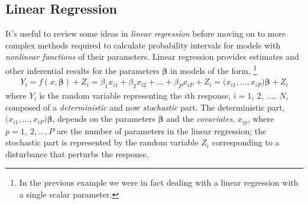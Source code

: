 \documentclass[11pt,a4paper]{article}
\begin{document}
\subsection{Linear Regression} %

It's useful to review some ideas in \emph{linear regression} before
moving on to more complex methods required to calculate probability
intervals for models with \emph{nonlinear functions} of their parameters. 
Linear regression provides estimates and other inferential results 
for the parameters \(\boldsymbol{\beta}\) in models of the form,%
\footnote{%
In the previous example we were in fact dealing with a
linear regression with a single scalar parameter.}
\begin{align}
Y_{i} = f\left( x,\boldsymbol{\beta} \right) + Z_{i} = 
\beta_{1}x_{i1} + \beta_{2}x_{i2} + \ldots + \beta_{P}x_{iP} + Z_{i} = 
(x_{i1}\boldsymbol{,\ldots,}x_{iP}\boldsymbol{)\beta} + Z_{i}
\end{align}
where \(Y_{i}\) is the random variable representing the \(i\)th
response, \(i = 1,\ 2,\ \ldots,\ N\), composed of a \emph{deterministic}
and now \emph{stochastic} part. The deterministic part,
\((x_{i1}\boldsymbol{,\ldots,}x_{iP}\boldsymbol{)\beta}\), depends on the
parameters \(\boldsymbol{\beta}\) and the \emph{covariates}, \(x_{ip}\),
where \(p = 1,\ 2,\ldots,P\) are the number of parameters in the linear
regression; the stochastic part is represented by the random variable
\(Z_{i}\) corresponding to a disturbance that perturbs the response.
\end{document}

